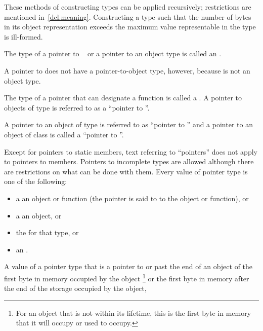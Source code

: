 \pnum
These methods of constructing types can be applied recursively;
restrictions are mentioned in~\ref{dcl.meaning}.
Constructing a type such that the number of
bytes in its object representation exceeds the maximum value representable in
the type  is ill-formed.

\pnum
{}%
The type of a pointer to \cv{}~ or a pointer to an object type is
called an . \begin{note} A pointer to 
does not have a pointer-to-object type, however, because  is not
an object type. \end{note} The type of a pointer that can designate a function
is called a .
A pointer to objects of type  is referred to as a ``pointer to
''. \begin{example} A pointer to an object of type  is
referred to as ``pointer to '' and a pointer to an object of
class  is called a ``pointer to ''. \end{example}
Except for pointers to static members, text referring to ``pointers''
does not apply to pointers to members. Pointers to incomplete types are
allowed although there are restrictions on what can be done with
them.
%
Every value of pointer type is one of the following:
\begin{itemize}
\item
a  an object or function (the pointer is said to  to the object or function), or
\item
a  an object, or
\item
{}
the  for that type, or
\item
{}
an .
\end{itemize}
A value of a
pointer type
that is a pointer to or past the end of an object
 of
the first byte in memory occupied by the object%
\footnote{For an object that is not within its lifetime,
this is the first byte in memory that it will occupy or used to occupy.}
or the first byte in memory
after the end of the storage occupied by the object,
